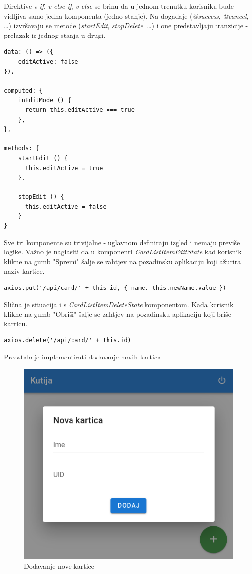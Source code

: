 Direktive \textit{v-if}, \textit{v-else-if}, \textit{v-else} se brinu da u jednom trenutku korisniku bude vidljiva samo
jedna komponenta (jedno stanje).
Na događaje (\textit{@success}, \textit{@cancel}, \ldots) izvršavaju se metode (\textit{startEdit}, \textit{stopDelete}, \ldots)
i one predstavljaju tranzicije - prelazak iz jednog stanja u drugi.

\begin{lstlisting}
data: () => ({
    editActive: false
}),

computed: {
    inEditMode () {
      return this.editActive === true
    },
},

methods: {
    startEdit () {
      this.editActive = true
    },

    stopEdit () {
      this.editActive = false
    }
}
\end{lstlisting}

Sve tri komponente su trivijalne - uglavnom definiraju izgled i nemaju previše logike.
Važno je naglasiti da u komponenti \textit{CardListItemEditState} kad korisnik klikne na gumb "Spremi" šalje se zahtjev
na pozadinsku aplikaciju koji ažurira naziv kartice.

\begin{lstlisting}
axios.put('/api/card/' + this.id, { name: this.newName.value })
\end{lstlisting}

Slična je situacija i s \textit{CardListItemDeleteState} komponentom.
Kada korisnik klikne na gumb "Obriši" šalje se zahtjev na pozadinsku aplikaciju koji briše karticu.

\begin{lstlisting}
axios.delete('/api/card/' + this.id)
\end{lstlisting}

Preostalo je implementirati dodavanje novih kartica.

\begin{figure}[h!]
    \centering
    \includegraphics[scale=0.5]{images/add-new-card}
    \caption{Dodavanje nove kartice}
    \label{fig:new-card-window}
\end{figure}

